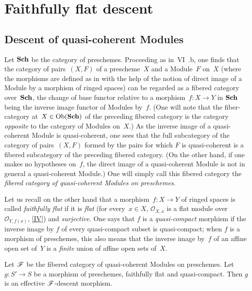 \chapter{Faithfully flat descent}
\label{VIII}

\section{Descent of quasi-coherent Modules}
\label{VIII.1}

Let $\mathbf{Sch}$
be the category of preschemes. Proceeding as
in~VI~.b, one finds that the category of
pairs~$(X,F)$ of a prescheme~$X$ and a Module~$F$ on~$X$
(where the morphisms are defined as in \loccit with the
help of the notion of direct image of a Module by a morphism
of ringed spaces) can be regarded as a
fibered category over~$\mathbf{Sch}$, the change of
base functor relative to a morphism~$f\colon X\to Y$
in $\mathbf{Sch}$ being the inverse image functor of Modules
by~$f$. (One will note that the fiber-category at~$X\in \operatorname{\mathrm{Ob}}(\mathbf{Sch})$ of
the preceding fibered category is the category
\emph{opposite} to the category of Modules on~$X$.) As
the inverse image of a quasi-coherent Module is quasi-coherent,
one sees that the full subcategory of the category of
pairs~$(X,F)$ formed by the pairs for which $F$ is
quasi-coherent is a fibered subcategory of the
preceding fibered category. (On the other hand, if one
makes no hypotheses on~$f$, the direct image of a
quasi-coherent Module is not in general a quasi-coherent
Module.) One will simply call this fibered
category the \emph{fibered category of quasi-coherent
Modules on preschemes}.

Let us recall on the other hand that a morphism~$f\colon X\to Y$ of
ringed spaces is called \emph{faithfully flat}
if it is \emph{flat} (\ie for every~$x\in X$, $\mathcal{O}_{X,x}$ is
a flat module over~$\mathcal{O}_{Y,f(x)}$, \eqref{IV}) and
\emph{surjective}. One says that $f$ is a \emph{quasi-compact} morphism
if the inverse image by $f$ of every quasi-compact subset is
quasi-compact; when $f$ is a morphism of preschemes,
this also means that the inverse image by~$f$ of an affine open set
of~$Y$ is a \emph{finite} union of affine open sets of~$X$.

\begin{theorem}
\label{VIII.1.1}
Let
$\cal{F}$ be the fibered category of quasi-coherent
Modules on preschemes. Let
$g\colon S'\to S$
be a morphism of preschemes, faithfully flat and
quasi-compact. Then $g$ is an effective $\cal{F}$-descent
morphism.
\end{theorem}

